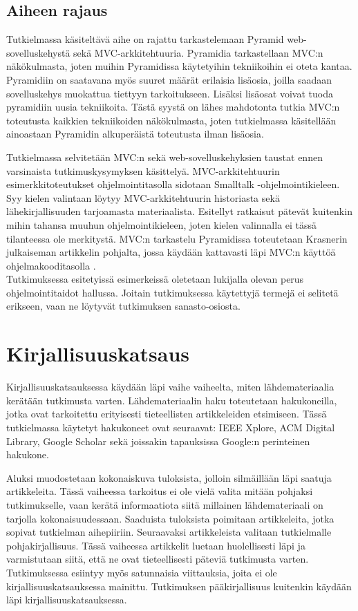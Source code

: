 \documentclass[finnish,utf8,nonumbib,palatino,kandi]{gradu2}
\begin{document}
\subsection{Aiheen rajaus}
Tutkielmassa käsiteltävä aihe on rajattu tarkastelemaan Pyramid web-sovelluskehystä sekä MVC-arkkitehtuuria. Pyramidia
tarkastellaan MVC:n näkökulmasta, joten muihin Pyramidissa käytetyihin tekniikoihin ei oteta kantaa. Pyramidiin on saatavana myös suuret määrät erilaisia lisäosia,
joilla saadaan sovelluskehys muokattua tiettyyn tarkoitukseen.
Lisäksi lisäosat voivat tuoda pyramidiin uusia tekniikoita. Tästä syystä on lähes mahdotonta tutkia MVC:n toteutusta kaikkien tekniikoiden näkökulmasta,
joten tutkielmassa käsitellään ainoastaan Pyramidin alkuperäistä toteutusta ilman lisäosia.

Tutkielmassa selvitetään MVC:n sekä web-sovelluskehyksien taustat ennen varsinaista tutkimuskysymyksen käsittelyä. MVC-arkkitehtuurin esimerkkitoteutukset ohjelmointitasolla sidotaan Smalltalk -ohjelmointikieleen.
Syy kielen valintaan löytyy MVC-arkkitehtuurin historiasta sekä lähekirjallisuuden tarjoamasta materiaalista. Esitellyt ratkaisut
pätevät kuitenkin mihin tahansa muuhun ohjelmointikieleen, joten kielen valinnalla ei tässä tilanteessa ole merkitystä.
 MVC:n tarkastelu Pyramidissa toteutetaan Krasnerin julkaiseman artikkelin pohjalta, jossa käydään kattavasti läpi MVC:n käyttöä ohjelmakooditasolla \cite{Krasner:desc}.  \\

Tutkimuksessa esitetyissä esimerkeissä oletetaan lukijalla olevan perus ohjelmointitaidot hallussa. Joitain tutkimuksessa käytettyjä termejä ei selitetä erikseen, vaan ne löytyvät tutkimuksen sanasto-osiosta.

\section{Kirjallisuuskatsaus}
Kirjallisuuskatsauksessa käydään läpi vaihe vaiheelta, miten lähdemateriaalia kerätään
tutkimusta varten. Lähdemateriaalin haku toteutetaan hakukoneilla, jotka ovat tarkoitettu
erityisesti tieteellisten artikkeleiden etsimiseen. Tässä tutkielmassa käytetyt hakukoneet ovat seuraavat:
IEEE Xplore, ACM Digital Library, Google Scholar sekä joissakin tapauksissa Google:n perinteinen hakukone.

Aluksi muodostetaan kokonaiskuva tuloksista, jolloin silmäillään läpi saatuja artikkeleita. Tässä
vaiheessa tarkoitus ei ole vielä valita mitään pohjaksi tutkimukselle, vaan kerätä informaatiota
siitä millainen lähdemateriaali on tarjolla kokonaisuudessaan. Saaduista tuloksista poimitaan artikkeleita,
jotka sopivat tutkielman aihepiiriin. Seuraavaksi artikkeleista valitaan tutkielmalle pohjakirjallisuus. Tässä vaiheessa artikkelit luetaan huolellisesti
läpi ja varmistutaan siitä, että ne ovat tieteellisesti päteviä tutkimusta varten. Tutkimuksessa esiintyy myös
satunnaisia viittauksia, joita ei ole kirjallisuuskatsauksessa mainittu. Tutkimuksen pääkirjallisuus kuitenkin käydään läpi kirjallisuuskatsauksessa.
\end{document}
